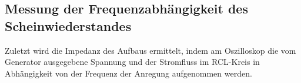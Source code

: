 \subsection{Messung der Frequenzabhängigkeit des Scheinwiederstandes}
Zuletzt wird die Impedanz des Aufbaus ermittelt, indem am Oszilloskop die vom
Generator ausgegebene Spannung und der Stromfluss im RCL-Kreis in Abhängigkeit
von der Frequenz der Anregung aufgenommen werden.
